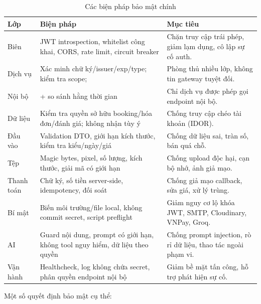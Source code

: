 \begin{table}[H]
\centering
\caption{Các biện pháp bảo mật chính}
\label{tab:bao-mat}
\small
\begin{tabularx}{\textwidth}{@{}L{3.0cm}L{5.4cm}Y@{}}
\toprule
\textbf{Lớp} & \textbf{Biện pháp} & \textbf{Mục tiêu}\\
\midrule
Biên & JWT introspection, whitelist công khai, CORS, rate limit, circuit breaker & Chặn truy cập trái phép, giảm lạm dụng, cô lập sự cố auth.\\
Dịch vụ & Xác minh chữ ký/issuer/exp/type; kiểm tra scope;  & Phòng thủ nhiều lớp, không tin gateway tuyệt đối.\\
Nội bộ &  +  so sánh hằng thời gian & Chỉ dịch vụ được phép gọi endpoint nội bộ.\\
Dữ liệu & Kiểm tra quyền sở hữu booking/hóa đơn/đánh giá; không nhận  tùy ý & Chống truy cập chéo tài khoản (IDOR).\\
Đầu vào & Validation DTO, giới hạn kích thước, kiểm tra kiểu/ngày/giá & Chống dữ liệu sai, tràn số, bán quá chỗ.\\
Tệp & Magic bytes, pixel, số lượng, kích thước, giải mã có giới hạn & Chống upload độc hại, cạn bộ nhớ, ảnh giả mạo.\\
Thanh toán & Chữ ký, số tiền server-side, idempotency, đối soát & Chống giả mạo callback, sửa giá, xử lý trùng.\\
Bí mật & Biến môi trường/file local, không commit secret, script preflight & Giảm nguy cơ lộ khóa JWT, SMTP, Cloudinary, VNPay, Groq.\\
AI & Guard nội dung, prompt có giới hạn, không tool nguy hiểm, dữ liệu theo quyền & Chống prompt injection, rò rỉ dữ liệu, thao tác ngoài phạm vi.\\
Vận hành & Healthcheck, log không chứa secret, phân quyền endpoint nội bộ & Giảm bề mặt tấn công, hỗ trợ phát hiện sự cố.\\
\bottomrule
\end{tabularx}
\end{table}

Một số quyết định bảo mật cụ thể:

